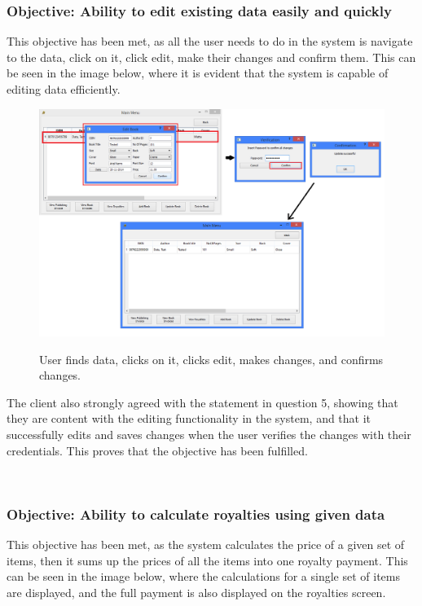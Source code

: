 \subsubsection{Objective: Ability to edit existing data easily and quickly}

This objective has been met, as all the user needs to do in the system is navigate to the data, click on it, click edit, make their changes and confirm them. This can be seen in the image below, where it is evident that the system is capable of editing data efficiently.

\begin{figure}[H]
    \includegraphics[width=\textwidth]{./Evaluation/Evidence/EditData.png}
    \label{fig:EditData} \caption{User finds data, clicks on it, clicks edit, makes changes, and confirms changes.}
\end{figure}

The client also strongly agreed with the statement in question 5, showing that they are content with the editing functionality in the system, and that it successfully edits and saves changes when the user verifies the changes with their credentials. This proves that the objective has been fulfilled.

\

\subsubsection{Objective: Ability to calculate royalties using given data}

This objective has been met, as the system calculates the price of a given set of items, then it sums up the prices of all the items into one royalty payment. This can be seen in the image below, where the calculations for a single set of items are displayed, and the full payment is also displayed on the royalties screen.

